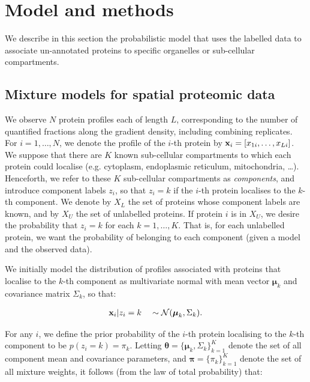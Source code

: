 \documentclass[12pt,english]{article}\usepackage[]{graphicx}\usepackage[]{color}
\begin{document}
\bigskip

\section{Model and methods}\label{section:methods}

We describe in this section the probabilistic model that uses the
labelled data to associate un-annotated proteins to specific
organelles or sub-cellular compartments.

\subsection{Mixture models for spatial proteomic data}

We observe $N$ protein profiles each of length $L$, corresponding to
the number of quantified fractions along the gradient density,
including combining replicates.  For $i = 1, \ldots, N$, we denote the
profile of the $i$-th protein by
${\bf x}_i = [x_{1i}, \ldots, x_{Li}]$.  We suppose that there are $K$
known sub-cellular compartments to which each protein could localise
(e.g. cytoplasm, endoplasmic reticulum, mitochondria, \ldots).
Henceforth, we refer to these $K$ sub-cellular compartments as {\em
  components}, and introduce component labels $z_i$, so that $z_i = k$
if the $i$-th protein localises to the $k$-th component. We denote by
$X_L$ the set of proteins whose component labels are known, and by
$X_U$ the set of unlabelled proteins.  If protein $i$ is in $X_U$, we
desire the probability that $z_i = k$ for each $k = 1, \ldots, K$.
That is, for each unlabelled protein, we want the probability of
belonging to each component (given a model and the observed data).


We initially model the distribution of profiles associated with
proteins that localise to the $k$-th component as multivariate normal
with mean vector $\boldsymbol{\mu}_k$ and covariance matrix
$\Sigma_k$, so that:

\begin{align}
{\bf x}_i | z_i = k \quad \sim \mathcal{N}(\boldsymbol{\mu}_k, \Sigma_k). \label{equation::preq}
\end{align}

For any $i$, we define the prior probability of the $i$-th protein
localising to the $k$-th component to be $p(z_i = k) = \pi_k$.
Letting
$\boldsymbol{\theta} = \{\boldsymbol{\mu}_k, \Sigma_k \}_{k = 1}^K$
denote the set of all component mean and covariance parameters, and
$\boldsymbol{\pi} = \{\pi_k\}_{k = 1}^K$ denote the set of all mixture
weights, it follows (from the law of total probability) that:
\end{document}

